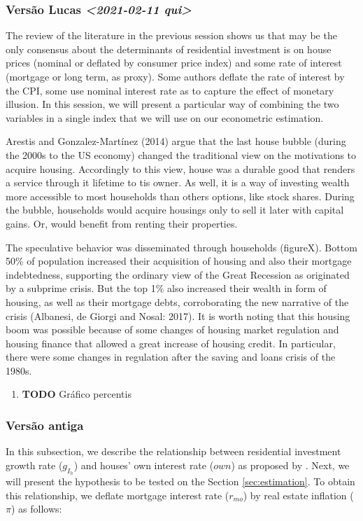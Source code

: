 \documentclass[12pt, a4paper]{article}
\begin{document}
\subsubsection{Versão Lucas \textit{<2021-02-11 qui>}}
\label{sec:org23839a0}
The review of the literature in the previous session shows us that may be the only
consensus about the determinants of residential investment is on house prices
(nominal or deflated by consumer price index) and some rate of interest (mortgage or
long term, as proxy). Some authors deflate the rate of interest by the CPI, some use
nominal interest rate as to capture the effect of monetary illusion. In this session, we
will present a particular way of combining the two variables in a single index that we
will use on our econometric estimation.

Arestis and Gonzalez-Martínez (2014) argue that the last house bubble (during the
2000s to the US economy) changed the traditional view on the motivations to acquire
housing. Accordingly to this view, house was a durable good that renders a service
through it lifetime to tis owner. As well, it is a way of investing wealth more
accessible to most households than others options, like stock shares. During the
bubble, households would acquire housings only to sell it later with capital gains. Or,
would benefit from renting their properties.

The speculative behavior was disseminated through households (figureX). Bottom
50\% of population increased their acquisition of housing and also their mortgage
indebtedness, supporting the ordinary view of the Great Recession as originated by a
subprime crisis. But the top 1\% also increased their wealth in form of housing, as well
as their mortgage debts, corroborating the new narrative of the crisis (Albanesi, de
Giorgi and Nosal: 2017). It is worth noting that this housing boom was possible
because of some changes of housing market regulation and housing finance that
allowed a great increase of housing credit. In particular, there were some changes in
regulation after the saving and loans crisis of the 1980s.

\begin{enumerate}
\item {\bfseries\sffamily TODO} Gráfico percentis
\label{sec:org03ebaa2}
\end{enumerate}

\subsubsection{Versão antiga}
\label{sec:org70b702e}
In this subsection, we describe the relationship between residential investment growth rate (\(g_{I_h}\)) and houses' own interest rate (\(own\)) as proposed by \textcite{teixeira_crescimento_2015}. 
Next, we will present the hypothesis to be tested on the Section \ref{sec:estimation}. To obtain this relationship, we deflate mortgage interest rate (\(r_{mo}\)) by real estate inflation (\(\pi\)) as follows:
\end{document}
